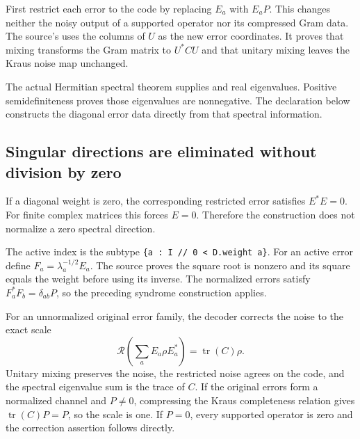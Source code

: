 
First restrict each error to the code by replacing $E_a$ with $E_aP$. This changes neither the noisy output of a supported operator nor its compressed Gram data. The source's  uses the columns of $U$ as the new error coordinates. It proves that mixing transforms the Gram matrix to $U^*CU$ and that unitary mixing leaves the Kraus noise map unchanged.

The actual Hermitian spectral theorem supplies  and real eigenvalues. Positive semidefiniteness proves those eigenvalues are nonnegative. The declaration below constructs the diagonal error data directly from that spectral information.



\subsection{Singular directions are eliminated without division by zero}
If a diagonal weight is zero, the corresponding restricted error satisfies $E^*E=0$. For finite complex matrices this forces $E=0$. Therefore the construction does not normalize a zero spectral direction.


The active index is the subtype \texttt{\{a : I // 0 < D.weight a\}}. For an active error define $F_a=\lambda_a^{-1/2}E_a$. The source proves the square root is nonzero and its square equals the weight before using its inverse. The normalized errors satisfy $F_a^*F_b=\delta_{ab}P$, so the preceding syndrome construction applies.

For an unnormalized original error family, the decoder corrects the noise to the exact scale
\[
\mathcal R\!\left(\sum_aE_a\rho E_a^*\right)=\operatorname{tr}(C)\rho.
\]
Unitary mixing preserves the noise, the restricted noise agrees on the code, and the spectral eigenvalue sum is the trace of $C$. If the original errors form a normalized channel and $P\ne0$, compressing the Kraus completeness relation gives $\operatorname{tr}(C)P=P$, so the scale is one. If $P=0$, every supported operator is zero and the correction assertion follows directly.

